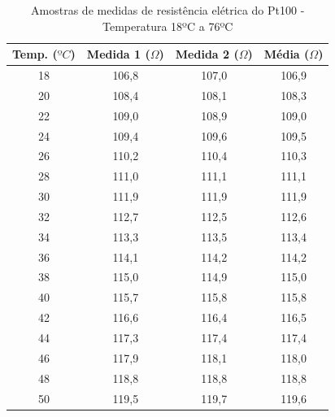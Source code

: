 \documentclass[a4paper]{instrumentacao}
\begin{document}
\begin{table}[H]
\centering
\caption{Amostras de medidas de resistência elétrica do Pt100 - Temperatura 18ºC a 76ºC}
\label{tab:amostras-pt100}
\begin{tabular}{|c|c|c|c|}
\hline
\textbf{Temp. ($ºC$)} & \textbf{Medida 1 ($\Omega$)} & \textbf{Medida 2 ($\Omega$)} & \textbf{Média ($\Omega$)} \\ \hline
18                  & 106,8                 & 107,0                 & 106,9          \\ \hline
20                  & 108,4                 & 108,1                 & 108,3          \\ \hline
22                  & 109,0                 & 108,9                 & 109,0          \\ \hline
24                  & 109,4                 & 109,6                 & 109,5          \\ \hline
26                  & 110,2                 & 110,4                 & 110,3          \\ \hline
28                  & 111,0                 & 111,1                 & 111,1          \\ \hline
30                  & 111,9                 & 111,9                 & 111,9          \\ \hline
32                  & 112,7                 & 112,5                 & 112,6          \\ \hline
34                  & 113,3                 & 113,5                 & 113,4          \\ \hline
36                  & 114,1                 & 114,2                 & 114,2          \\ \hline
38                  & 115,0                 & 114,9                 & 115,0          \\ \hline
40                  & 115,7                 & 115,8                 & 115,8          \\ \hline
42                  & 116,6                 & 116,4                 & 116,5          \\ \hline
44                  & 117,3                 & 117,4                 & 117,4          \\ \hline
46                  & 117,9                 & 118,1                 & 118,0          \\ \hline
48                  & 118,8                 & 118,8                 & 118,8          \\ \hline
50                  & 119,5                 & 119,7                 & 119,6          \\ \hline

\end{tabular}
\end{table}
\end{document}
